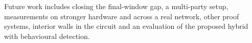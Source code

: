 \documentclass[conference]{IEEEtran}
\begin{document}
Future work includes closing the final-window gap, a multi-party setup, measurements on stronger hardware and across a real network, other proof systems, interior walls in the circuit and an evaluation of the proposed hybrid with behavioural detection.

\balance


\end{document}
